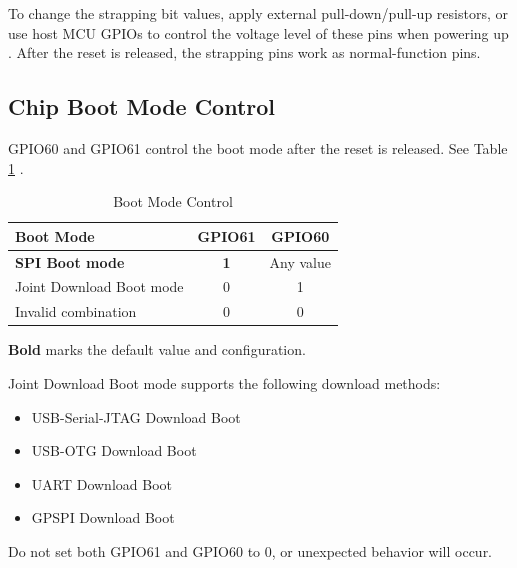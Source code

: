 \documentclass[main\_\_EN.tex]{subfiles}
\begin{document}
To change the strapping bit values, apply external pull-down/pull-up resistors, or use host MCU GPIOs to control the voltage level of these pins when powering up \chipname{}. After the reset is released, the strapping pins work as normal-function pins.

\subsection{Chip Boot Mode Control}
\label{sec:bootModeControl}

GPIO60 and GPIO61 control the boot mode after the reset is released. See Table \ref{tab:bootctrl-boot-mode-control} \textit{}.

\begin{table}[H]
    \centering
    \caption{Boot Mode Control}
    \label{tab:bootctrl-boot-mode-control}

    \begin{threeparttable}
    \begin{tabular}{ | l | c | c | }
    \hline
        \rowcolor{lightgray}
        \textbf{Boot Mode} & \textbf{GPIO61} & \textbf{GPIO60} \\\hline
        
        \textbf{SPI Boot mode} \tnote{1} & \textbf{1} & Any value \\\hline
        Joint Download Boot mode \tnote{2} & 0 & 1 \\\hline
        Invalid combination\tnote{3} & 0 & 0 \\\hline 
        \end{tabular}

        \begin{tablenotes}
            \item[1] \textbf{Bold} marks the default value and configuration.
            \item[2] Joint Download Boot mode supports the following download methods:
                \begin{itemize}
                    \item USB-Serial-JTAG Download Boot
                    \item USB-OTG Download Boot
                    \item UART Download Boot
                    \item GPSPI Download Boot
                \end{itemize}
        \item[3]  Do not set both GPIO61 and GPIO60 to 0, or unexpected behavior will occur. 
        \end{tablenotes}
     \end{threeparttable}
\end{table}
\end{document}
